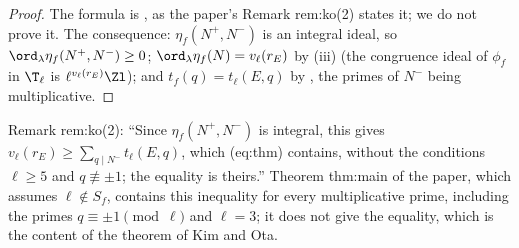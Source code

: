 \begin{proof}
The formula is \cite[Theorem 1.3]{KimOta}, as the paper's Remark rem:ko(2) states it; we do not prove it. The consequence: $\eta_f(N^+,N^-)$ is an integral ideal, so
$\ord_\lambda\eta_f(N^+,N^-)\ge0$; $\ord_\lambda\eta_f(N)=v_\ell(r_E)$ by (iii) (the congruence ideal of $\phi_f$ in $\T_\ell$ is $\ell^{v_\ell(r_E)}\Zl$); and $t_f(q)=t_\ell(E,q)$ by
, the primes of $N^-$ being multiplicative.
\end{proof}

\begin{paperlink}
Remark rem:ko(2): ``Since $\eta_f(N^+,N^-)$ is integral, this gives $v_\ell(r_E)\ge\sum_{q\mid N^-}t_\ell(E,q)$, which (eq:thm) contains, without the conditions $\ell\ge5$ and $q\not\equiv\pm1$;
the equality is theirs.'' Theorem thm:main of the paper, which assumes $\ell\notin S_f$, contains this inequality for every multiplicative prime, including the
primes $q\equiv\pm1\pmod\ell$ and $\ell=3$; it does not give the equality, which is the content of the theorem of Kim and Ota.
\end{paperlink}

